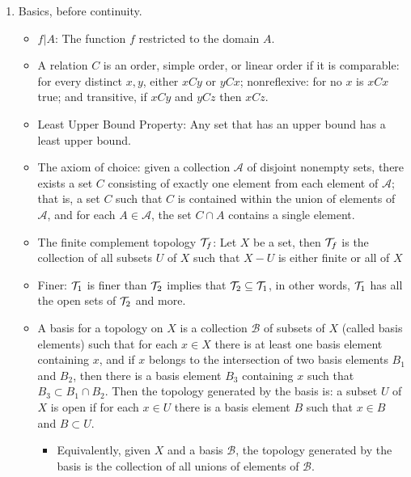 \documentclass[12pt,letterpaper]{article}
\begin{document}
\begin{enumerate}
  \item \label{sec:EarlyChapters} Basics, before continuity. \begin{itemize}
    \item \label{dfn:functionRestriction} $f|A$: The function $f$ restricted to the domain $A$.
    \item \label{dfn:simpleOrder} A relation $C$ is an order, simple order, or linear order if it is comparable: for every distinct $x,y$, either $xCy$ or $yCx$; nonreflexive: for no $x$ is $xCx$ true; and transitive, if $xCy$ and $yCz$ then $xCz$.
    \item \label{dfn:leastUpperBoundProperty} Least Upper Bound Property: Any set that has an upper bound has a least upper bound.
    \item \label{thm:AxiomChoice} The axiom of choice: given a collection $\mathcal{A}$ of disjoint nonempty sets, there exists a set $C$ consisting of exactly one element from each element of $\mathcal{A}$; that is, a set $C$ such that $C$ is contained within the union of elements of $\mathcal{A}$, and for each $A\in\mathcal{A}$, the set $C\cap A$ contains a single element.
    \item \label{dfn:finiteComplementTopology} The finite complement topology $\mathcal{T}_f$: Let $X$ be a set, then $\mathcal{T}_f$ is the collection of all subsets $U$ of $X$ such that $X-U$ is either finite or all of $X$
    \item \label{dfn:finer} Finer: $\mathcal{T}_1$ is finer than $\mathcal{T}_2$ implies that $\mathcal{T}_2\subseteq \mathcal{T}_1$, in other words, $\mathcal{T}_1$ has all the open sets of $\mathcal{T}_2$ and more.
    \item \label{dfn:basis} A basis for a topology on $X$ is a collection $\mathcal{B}$ of subsets of $X$ (called basis elements) such that for each $x\in X$ there is at least one basis element containing $x$, and if $x$ belongs to the intersection of two basis elements $B_1$ and $B_2$, then there is a basis element $B_3$ containing $x$ such that $B_3 \subset B_1 \cap B_2$. Then the topology generated by the basis is: a subset $U$ of $X$ is open if for each $x\in U$ there is a basis element $B$ such that $x\in B$ and $B\subset U$.
    \begin{itemize}
      \item \label{thm:basisUnion} Equivalently, given $X$ and a basis $\mathcal{B}$, the topology generated by the basis is the collection of all unions of elements of $\mathcal{B}$.

\end{itemize}
\end{itemize}
\end{enumerate}
\end{document}

